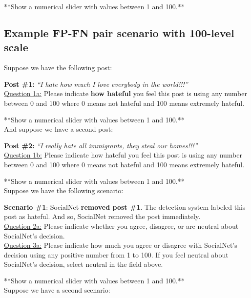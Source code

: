 \documentclass[a4paper]{article}
\begin{document}
**Show a numerical slider with values between 1 and 100.**\\

\subsection{Example FP-FN pair scenario with 100-level scale}

Suppose we have the following post:

\textbf{Post \#1:} \textit{“I hate how much I love everybody in the world!!!”}\\

\underline{Question 1a:} Please indicate \textbf{how hateful} you feel this post is using any number between 0 and 100 where 0 means not hateful and 100 means extremely hateful.

**Show a numerical slider with values between 1 and 100.**\\

And suppose we have a second post:

\textbf{Post \#2:} \textit{“I really hate all immigrants, they steal our homes!!!”}\\

\underline{Question 1b:} Please indicate how hateful you feel this post is using any number between 0 and 100 where 0 means not hateful and 100 means extremely hateful.

**Show a numerical slider with values between 1 and 100.**\\

Suppose we have the following scenario:

\textbf{Scenario \#1}: SocialNet \textbf{removed post \#1}. The detection system labeled this post as hateful. And so, SocialNet removed the post immediately.\\

\underline{Question 2a:} Please indicate whether you agree, disagree, or are neutral about SocialNet’s decision.\\

\underline{Question 3a:} Please indicate how much you agree or disagree with SocialNet’s decision using any positive number from 1 to 100. If you feel neutral about SocialNet’s decision, select neutral in the field above.

**Show a numerical slider with values between 1 and 100.**\\

Suppose we have a second scenario:
\end{document}
